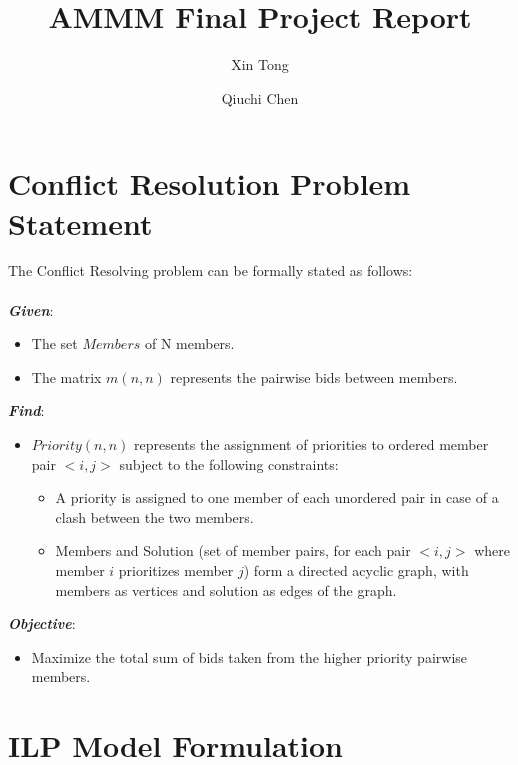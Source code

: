 \documentclass{article}
\title{\textbf{AMMM Final Project Report}}
\author[1]{Xin Tong}
\author[2]{Qiuchi Chen}
\affil[1]{MIRI \href{mailto:xin.tong@estudiantat.upc.edu}{xin.tong@estudiantat.upc.edu}}
\affil[2]{MIRI \href{mailto:qiuchi.chen@estudiantat.upc.edu}{qiuchi.chen@estudiantat.upc.edu}}
\begin{document}
\maketitle


\tableofcontents

\newpage

\section{Conflict Resolution Problem Statement}

The Conflict Resolving problem can be formally stated as follows:\\
\\
\textbf{\textit{Given}}:
\begin{itemize}
    \item The set $Members$ of N members.
    \item The matrix $m(n, n)$ represents the pairwise bids between members.
\end{itemize}

\textbf{\textit{Find}}:
\begin{itemize}
    \item $Priority(n,n)$ represents the assignment of priorities to ordered member pair $<i,j>$ subject to the following constraints: \begin{itemize}
        \item A priority is assigned to one member of each unordered pair in case of a clash between the two members.
        \item Members and Solution (set of member pairs, for each pair $<i,j>$ where member $i$ prioritizes member $j$) form a directed acyclic graph, with members as vertices and solution as edges of the graph.
    \end{itemize}
\end{itemize}

\textbf{\textit{Objective}}:
\begin{itemize}
    \item Maximize the total sum of bids taken from the higher priority pairwise members.
\end{itemize}


\section{ILP Model Formulation}
\end{document}
